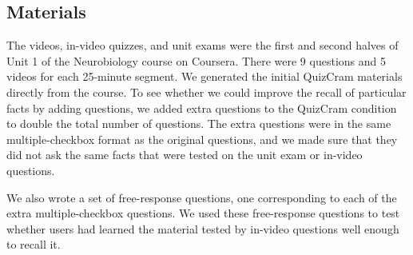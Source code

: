 \documentclass{chi-ext}
\begin{document}
\subsection{Materials}



The videos, in-video quizzes, and unit exams were the first and second halves of Unit 1 of the Neurobiology course on Coursera. There were 9 questions and 5 videos for each 25-minute segment. We generated the initial QuizCram materials directly from the course. To see whether we could improve the recall of particular facts by adding questions, we added extra questions to the QuizCram condition to double the total number of questions. The extra questions were in the same multiple-checkbox format as the original questions, and we made sure that they did not ask the same facts that were tested on the unit exam or in-video questions.

We also wrote a set of free-response questions, one corresponding to each of the extra multiple-checkbox questions. We used these free-response questions to test whether users had learned the material tested by in-video questions well enough to recall it.

\end{document}
